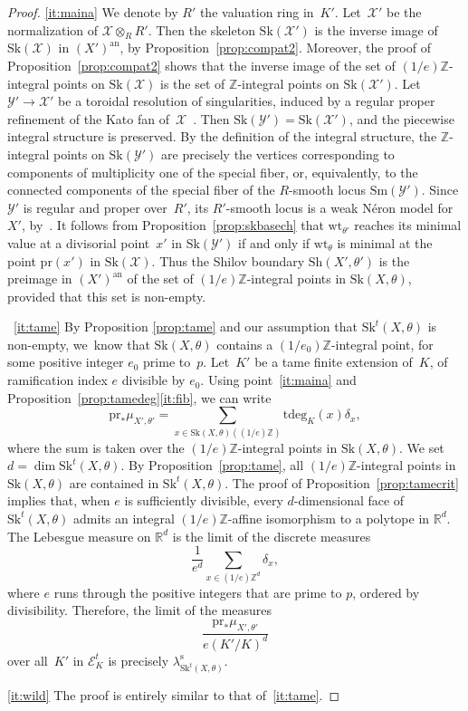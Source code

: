 \documentclass[11pt]{article}
\newcommand{\skpt}{\smallskip}
\let\mathcal\mathscr
\theoremstyle{definition}
\numberwithin{equation}{subsection}
\newcommand{\Z}{\ensuremath{\mathbb{Z}}}
\newcommand{\R}{\ensuremath{\mathbb{R}}}
\newcommand{\cX}{\ensuremath{\mathscr{X}}}
\newcommand{\cY}{\ensuremath{\mathscr{Y}}}
\newcommand{\an}{\mathrm{an}}
\newcommand{\pr}{\mathrm{pr}}
\newcommand{\Sh}{\mathrm{Sh}}
\newcommand{\Sk}{\mathrm{Sk}}
\newcommand{\Sm}{\mathrm{Sm}}
\newcommand{\rs}{\mathrm{s}}
\newcommand{\tdeg}{\mathrm{tdeg}}
\newcommand{\wt}{\mathrm{wt}}
\let\form\theta
\let\Leb\lambda
\begin{document}
\skpt
\begin{proof}
\eqref{it:maina} We denote by $R'$ the valuation ring in~$K'$.
Let~$\cX'$ be the normalization of $\cX\otimes_R R'$. Then the skeleton $\Sk(\cX')$ is the inverse image of $\Sk(\cX)$ in $(X')^{\an}$, by Proposition~\ref{prop:compat2}. Moreover, the proof of Proposition~\ref{prop:compat2} shows that the inverse image of the set of $(1/e)\Z$-integral points on $\Sk(\cX)$ is the set of $\Z$-integral points on $\Sk(\cX')$. Let $\cY'\to \cX'$ be a toroidal resolution of singularities, induced by a regular proper refinement of the Kato fan of~$\cX$~\cite[\S10]{kato}.
Then $\Sk(\cY')=\Sk(\cX')$, and the piecewise integral structure is preserved. By the definition of the integral structure, the $\Z$-integral points
on $\Sk(\cY')$ are precisely the vertices corresponding to components of multiplicity one of the special fiber, or, equivalently, to the connected components of
the special fiber of the $R$\nobreakdash-smooth locus $\Sm(\cY')$. Since $\cY'$ is regular and proper over~$R'$, its $R'$-smooth locus is a weak Néron model for $X'$, by~\cite[3.1/2]{BLR}. It follows from Proposition~\ref{prop:skbasech} that $\wt_{\form'}$ reaches its minimal value at a divisorial point~$x'$ in $\Sk(\cY')$ if and only if
$\wt_{\form}$ is minimal at the point $\pr(x')$ in $\Sk(\cX)$. Thus the Shilov boundary $\Sh(X',\form')$ is the preimage in $(X')^{\an}$ of the set of $(1/e)\Z$-integral points in $\Sk(X,\form)$, provided that this set is non-empty.

~\eqref{it:tame}
By Proposition \ref{prop:tame} and our assumption that $\Sk^t(X,\form)$ is non-empty, we~know that $\Sk(X,\form)$ contains a $(1/e_0)\Z$-integral point, for some positive integer $e_0$ prime to~$p$.
Let~$K'$ be a tame finite extension of~$K$, of ramification index $e$ divisible by $e_0$.
Using point~\eqref{it:maina} and Proposition~\ref{prop:tamedeg}\eqref{it:fib}, we can write
\[
\pr_\ast\mu_{X',\form'}=\sum_{x\in \Sk(X,\form)((1/e)\Z)} \tdeg_K(x)\delta_x,
\]
where the sum is taken over the $(1/e)\Z$-integral points in $\Sk(X,\form)$.
We set $d=\dim \Sk^t(X,\form)$.
By Proposition~\ref{prop:tame}, all $(1/e)\Z$-integral points in $\Sk(X,\form)$ are contained in $\Sk^t(X,\form)$.
The proof of Proposition~\ref{prop:tamecrit} implies that,
when $e$ is sufficiently divisible, every
$d$-dimensional face of $\Sk^t(X,\form)$ admits an integral $(1/e)\Z$-affine isomorphism
to a polytope in $\R^d$.
The Lebesgue measure on $\R^d$ is the limit of the discrete measures
\[
\frac{1}{e^d}\sum_{x\in (1/e)\Z^d}\delta_x,
\]
where $e$ runs through the positive integers that are prime to $p$, ordered by divisibility.
Therefore,
the limit of the measures
\[
\frac{\pr_\ast\mu_{X',\form'}}{e(K'/K)^{d}}
\]
over all~$K'$ in $\mathcal{E}^t_K$ is precisely
$\Leb^{\rs}_{\Sk^t(X,\form)}$.

\eqref{it:wild} The proof is entirely similar to that of~\eqref{it:tame}.
\end{proof}
\end{document}
